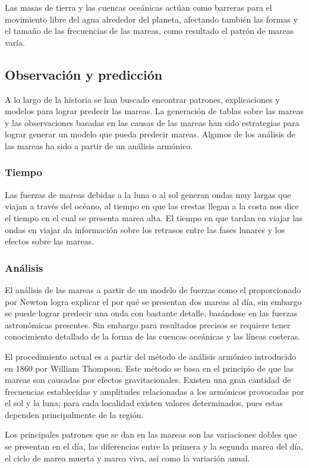 Las masas de tierra y las cuencas oceánicas actúan como barreras para el movimiento libre del agua alrededor del planeta, afectando también las formas y el tamaño de las frecuencias de las mareas, como resultado el patrón de mareas varía.

\subsection{Observación y predicción}
A lo largo de la historia se han buscado encontrar patrones, explicaciones y modelos para lograr predecir las mareas. La generación de tablas sobre las mareas y las observaciones basadas en las causas de las mareas han sido estrategias para lograr generar un modelo que pueda predecir mareas. Algunos de los análisis de las mareas ha sido a partir de un análisis armónico.

\subsubsection{Tiempo}
Las fuerzas de mareas debidas a la luna o al sol generan ondas muy largas que viajan a través del océano, al tiempo en que las crestas llegan a la costa nos dice el tiempo en el cual se presenta marea alta. El tiempo en que tardan en viajar las ondas en viajar da información sobre los retrasos entre las fases lunares y los efectos sobre las mareas.

\subsubsection{Análisis}
El análisis de las mareas a partir de un modelo de fuerzas como el proporcionado por Newton logra explicar el por qué se presentan dos mareas al día, sin embargo se puede lograr predecir una onda con bastante detalle, basándose en las fuerzas astronómicas presentes. Sin embargo para resultados precisos se requiere tener conocimiento detallado de la forma de las cuencas oceánicas y las líneas costeras.

El procedimiento actual es a partir del método de análisis armónico introducido en 1860 por William Thompson. Este método se basa en el principio de que las mareas son causadas por efectos gravitacionales. Existen una gran cantidad de frecuencias establecidas y amplitudes relacionadas a los armónicos provocadas por el sol y la luna; para cada localidad existen valores determinados, pues estas dependen principalmente de la región.

Los principales patrones que se dan en las mareas son las variaciones dobles que se presentan en el día, las diferencias entre la primera y la segunda marea del día, el ciclo de marea muerta y marea viva, así como la variación anual.

